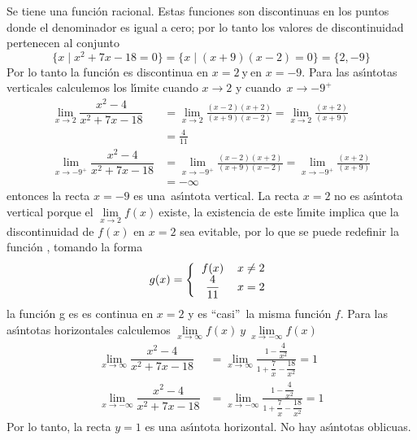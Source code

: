 \begin{sol}
Se tiene una funci\'{o}n racional. Estas funciones son discontinuas en los
puntos donde el denominador es igual a cero; por lo tanto los valores de
discontinuidad pertenecen al conjunto%
\[
\{ x \mid x^{2}+7x-18 =0\} =\{ x \mid(x+9) ( x-2)=0\}=\{2,-9\}
\]
Por lo tanto la funci\'{o}n es discontinua en $x=2\ $y$\ $en $x=-9.$\newline
Para las as\'{\i}ntotas verticales calculemos los l\'{\i}mite cuando
$x\rightarrow2$ y cuando\ $x\rightarrow-9^{+}$%
\begin{align*}
\lim\limits_{x\rightarrow2}\dfrac{x^{2}-4}{x^{2}+7x-18}  &  =\lim
\limits_{x\rightarrow2}\frac{\left(  x-2\right)  \left(  x+2\right)  }{\left(
x+9\right)  \left(  x-2\right)  }=\lim\limits_{x\rightarrow2}\frac{\left(
x+2\right)  }{\left(  x+9\right)  }\\
&  =\frac{4}{11}\\
\lim\limits_{x\rightarrow-9^{+}}\dfrac{x^{2}-4}{x^{2}+7x-18}  &
=\lim\limits_{x\rightarrow-9^{+}}\frac{\left(  x-2\right)  \left(  x+2\right)
}{\left(  x+9\right)  \left(  x-2\right)  }=\lim\limits_{x\rightarrow-9^{+}%
}\frac{\left(  x+2\right)  }{\left(  x+9\right)  }\\
&  =-\infty
\end{align*}
entonces la recta $x=-9$ es una\ as\'{\i}ntota vertical. La recta $x=2$ no es
as\'{\i}ntota vertical porque el $\lim\limits_{x\rightarrow2}f\left(
x\right)  \ $existe, la existencia de este l\'{\i}mite implica que la
discontinuidad de $f(x)$ en $x=2$ sea evitable, por lo que se puede redefinir
la funci\'{o}n , tomando la forma
\[
g(x)=\left\{
\begin{tabular}
[c]{cc}%
$f(x)$ & $x\neq2$\\
$\dfrac{4}{11}$ & $x=2$%
\end{tabular}
\right.
\]
la funci\'{o}n g es es continua en $x=2$ y es ``casi''\ la misma funci\'{o}n
$f$. \newline Para las as\'{\i}ntotas horizontales calculemos $\lim
\limits_{x\rightarrow\infty}f\left(  x\right)  \ y\ \lim\limits_{x\rightarrow
-\infty}f\left(  x\right)  $%
\begin{align*}
\lim\limits_{x\rightarrow\infty}\dfrac{x^{2}-4}{x^{2}+7x-18}  &
=\lim\limits_{x\rightarrow\infty}\frac{1-\dfrac{4}{x^{2}}}{1+\dfrac{7}%
{x}-\dfrac{18}{x^{2}}}=1\\
\lim\limits_{x\rightarrow-\infty}\dfrac{x^{2}-4}{x^{2}+7x-18}  &
=\lim\limits_{x\rightarrow-\infty}\frac{1-\dfrac{4}{x^{2}}}{1+\dfrac{7}%
{x}-\dfrac{18}{x^{2}}}=1
\end{align*}
Por lo tanto, la recta $y=1$ es una as\'{\i}ntota horizontal. No hay
as\'{\i}ntotas oblicuas.
\end{sol}

